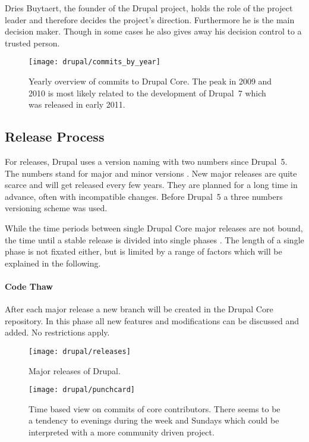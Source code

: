Dries Buytaert, the founder of the Drupal project, holds the role of the
project leader and therefore decides the project's direction. Furthermore he is
the main decision maker. Though in some cases he also gives away his decision
control to a trusted person.

\begin{figure}[htbp]
  \centering
  \texttt{[image: drupal/commits\_by\_year]}
  \caption[Commits by Year, Drupal]
  {Yearly overview of commits to Drupal Core. The peak in 2009 and 2010 is most
    likely related to the development of Drupal~7 which was released in early
    2011.}
  \label{fig:drupal:cby}
\end{figure}


\subsection{Release Process} %

For releases, Drupal uses a version naming with two numbers since Drupal~5. The
numbers stand for major and minor versions \cite{DrupalUpgrade}. New major
releases are quite scarce and will get released every few years. They are
planned for a long time in advance, often with incompatible changes. Before
Drupal~5 a three numbers versioning scheme was used.

While the time periods between single Drupal Core major releases are not bound,
the time until a stable release is divided into single phases
\cite{DrupalReleaseCycle}. The length of a single phase is not fixated either,
but is limited by a range of factors which will be explained in the following.

\paragraph{Code Thaw}

After each major release a new branch will be created in the Drupal Core
repository. In this phase all new features and modifications can be discussed
and added. No restrictions apply.

\vfill
\begin{figure}[bhtp]
  \centering
  \texttt{[image: drupal/releases]}
  \caption[Major Releases of Drupal]{Major releases of Drupal.}
\end{figure}

\begin{figure}[htbp]
  \centering
  \texttt{[image: drupal/punchcard]}
  \caption[Time Based View on Commits, Drupal]
  {Time based view on commits of core contributors. There seems to be a
    tendency to evenings during the week and Sundays which could be interpreted
    with a more community driven project.}
  \label{fig:drupal:p}
\end{figure}

